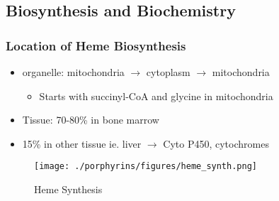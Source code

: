\documentclass{scrartcl}
\begin{document}
\subsection{Biosynthesis and Biochemistry}
\label{sec:orga59cc25}
\subsubsection{Location of Heme Biosynthesis}
\label{sec:orgd7d4293}
\begin{itemize}
\item organelle: mitochondria \(\to\) cytoplasm \(\to\) mitochondria
\begin{itemize}
\item Starts with succinyl-CoA and glycine in mitochondria
\end{itemize}
\item Tissue: 70-80\% in bone marrow
\item 15\% in other tissue ie. liver \(\to\) Cyto P450, cytochromes
\end{itemize}

\begin{figure}[htbp]
\centering
\texttt{[image: ./porphyrins/figures/heme\_synth.png]}
\caption{\label{fig:orgdfdf3fd}
Heme Synthesis}
\end{figure}
\end{document}
